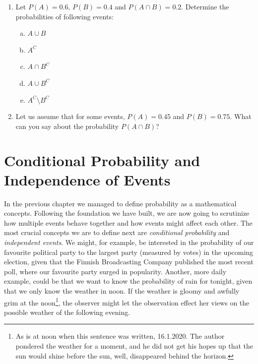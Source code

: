 \documentclass[12pt,a4paper,leqno]{report}
\theoremstyle{plain}
\theoremstyle{definition}
\begin{document}
\begin{enumerate}
\item Let $P(A)  = 0.6$, $P(B) = 0.4$ and $P(A \cap B) = 0.2$. Determine the probabilities of following events:
\begin{enumerate}[(a)]
\item $A \cup B$
\item $A^C$
\item $A \cap B^C$
\item $A \cup B^C$
\item $A^C \setminus B^C$
\end{enumerate}
\item Let us assume that for some events, $P(A) = 0.45$ and $P(B) = 0.75$. What can you say about the probability $P(A \cap B)$?
\end{enumerate}

\bigskip


\chapter{Conditional Probability and Independence of Events}\label{conditional}

In the previous chapter we managed to define probability as a mathematical concepts. Following the foundation we have built, we are now going to scrutinize how multiple events behave together and how events might affect each other. The most crucial concepts we are to define next are \emph{conditional probability} and \emph{independent events}. We might, for example, be interested in the probability of our favourite political party to the largest party (measured by votes) in the upcoming election, given that the Finnish Broadcasting Company published the most recent poll, where our favourite party surged in popularity. Another, more daily example, could be that we want to know the probability of rain for tonight, given that we only know the weather in noon. If the weather is gloomy and awfully grim at the noon\footnote{As is at noon when this sentence was written, 16.1.2020. The author pondered the weather for a moment, and he did not get his hopes up that the sun would shine before the sun, well, disappeared behind the horizon.}, the observer might let the observation effect her views on the possible weather of the following evening.
\end{document}
